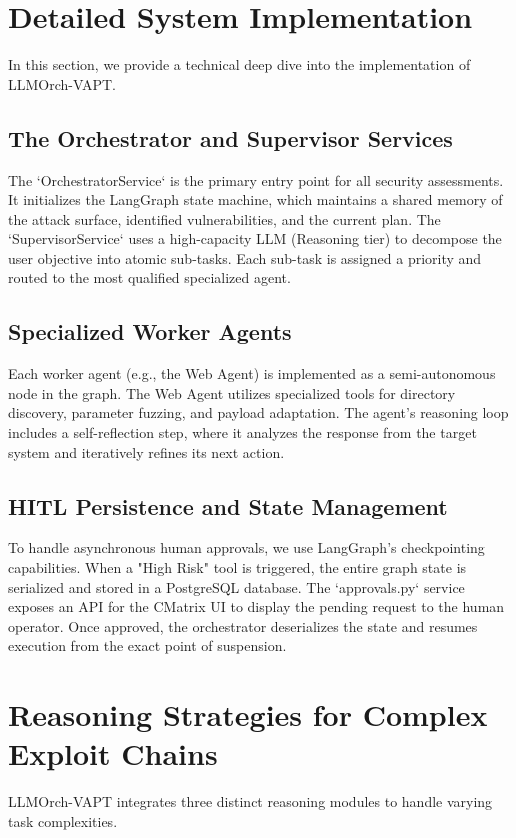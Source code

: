 \documentclass[conference,compsoc]{IEEEtran}
\begin{document}
\section{Detailed System Implementation}
In this section, we provide a technical deep dive into the implementation of LLMOrch-VAPT.

\subsection{The Orchestrator and Supervisor Services}
The `OrchestratorService` is the primary entry point for all security assessments. It initializes the LangGraph state machine, which maintains a shared memory of the attack surface, identified vulnerabilities, and the current plan. The `SupervisorService` uses a high-capacity LLM (Reasoning tier) to decompose the user objective into atomic sub-tasks. Each sub-task is assigned a priority and routed to the most qualified specialized agent.

\subsection{Specialized Worker Agents}
Each worker agent (e.g., the Web Agent) is implemented as a semi-autonomous node in the graph. The Web Agent utilizes specialized tools for directory discovery, parameter fuzzing, and payload adaptation. The agent's reasoning loop includes a self-reflection step, where it analyzes the response from the target system and iteratively refines its next action.

\subsection{HITL Persistence and State Management}
To handle asynchronous human approvals, we use LangGraph's checkpointing capabilities. When a "High Risk" tool is triggered, the entire graph state is serialized and stored in a PostgreSQL database. The `approvals.py` service exposes an API for the CMatrix UI to display the pending request to the human operator. Once approved, the orchestrator deserializes the state and resumes execution from the exact point of suspension.

\section{Reasoning Strategies for Complex Exploit Chains}
LLMOrch-VAPT integrates three distinct reasoning modules to handle varying task complexities.
\end{document}

